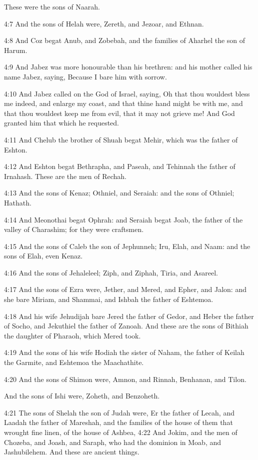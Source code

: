 These were the sons of Naarah.

4:7 And the sons of Helah were, Zereth, and Jezoar, and Ethnan.

4:8 And Coz begat Anub, and Zobebah, and the families of Aharhel the son of Harum.

4:9 And Jabez was more honourable than his brethren: and his mother called his name Jabez, saying, Because I bare him with sorrow.

4:10 And Jabez called on the God of Israel, saying, Oh that thou wouldest bless me indeed, and enlarge my coast, and that thine hand might be with me, and that thou wouldest keep me from evil, that it may not grieve me! And God granted him that which he requested.

4:11 And Chelub the brother of Shuah begat Mehir, which was the father of Eshton.

4:12 And Eshton begat Bethrapha, and Paseah, and Tehinnah the father of Irnahash. These are the men of Rechah.

4:13 And the sons of Kenaz; Othniel, and Seraiah: and the sons of Othniel; Hathath.

4:14 And Meonothai begat Ophrah: and Seraiah begat Joab, the father of the valley of Charashim; for they were craftsmen.

4:15 And the sons of Caleb the son of Jephunneh; Iru, Elah, and Naam: and the sons of Elah, even Kenaz.

4:16 And the sons of Jehaleleel; Ziph, and Ziphah, Tiria, and Asareel.

4:17 And the sons of Ezra were, Jether, and Mered, and Epher, and Jalon: and she bare Miriam, and Shammai, and Ishbah the father of Eshtemoa.

4:18 And his wife Jehudijah bare Jered the father of Gedor, and Heber the father of Socho, and Jekuthiel the father of Zanoah. And these are the sons of Bithiah the daughter of Pharaoh, which Mered took.

4:19 And the sons of his wife Hodiah the sister of Naham, the father of Keilah the Garmite, and Eshtemoa the Maachathite.

4:20 And the sons of Shimon were, Amnon, and Rinnah, Benhanan, and Tilon.

And the sons of Ishi were, Zoheth, and Benzoheth.

4:21 The sons of Shelah the son of Judah were, Er the father of Lecah, and Laadah the father of Mareshah, and the families of the house of them that wrought fine linen, of the house of Ashbea, 4:22 And Jokim, and the men of Chozeba, and Joash, and Saraph, who had the dominion in Moab, and Jashubilehem. And these are ancient things.

